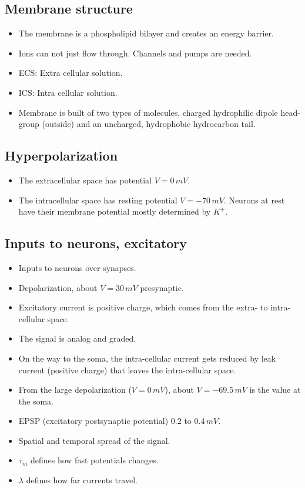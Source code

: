 \documentclass[main]{subfiles}
\begin{document}
\subsection{Membrane structure}
\begin{itemize}[noitemsep,nolistsep]
	\item The membrane is a phospholipid bilayer and creates an energy barrier.
	\item Ions can not just flow through. Channels and pumps are needed.
	\item ECS: Extra cellular solution.
	\item ICS: Intra cellular solution.
	\item Membrane is built of two types of molecules, charged hydrophilic dipole head-group (outside) and an uncharged, hydrophobic hydrocarbon tail.
\end{itemize}

\subsection{Hyperpolarization}
\begin{itemize}[noitemsep,nolistsep]
	\item The extracellular space has potential $V=0\,mV$.
	\item The intracellular space has resting potential $V=-70\,mV$. Neurons at rest have their membrane potential mostly determined by $K^+$.
\end{itemize}

\subsection{Inputs to neurons, excitatory}
\begin{itemize}[noitemsep,nolistsep]
	\item Inputs to neurons over synapses.
	\item Depolarization, about $V=30\,mV$ presynaptic.
	\item Excitatory current is positive charge, which comes from the extra- to intra-cellular space.
	\item The signal is analog and graded.
	\item On the way to the soma, the intra-cellular current gets reduced by leak current (positive charge) that leaves the intra-cellular space.
	\item From the large depolarization ($V=0\,mV$), about $V=-69.5\,mV$ is the value at the soma.
	\item EPSP (excitatory postsynaptic potential) $0.2$ to $0.4\,mV$.
	\item Spatial and temporal spread of the signal.
	\item $\tau_m$ defines how fast potentials changes.
	\item $\lambda$ defines how far currents travel.
\end{itemize}
\end{document}
